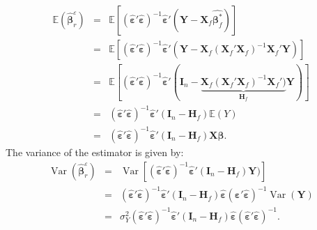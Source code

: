 \documentclass[12pt,a4paper]{report}
\begin{document}
\begin{eqnarray}
	\mathbb{E}(\hat{\boldsymbol{\beta}}_r^{\varepsilon})&=&\mathbb{E}[(\hat{\boldsymbol{\varepsilon}}'\hat{\boldsymbol{\varepsilon}})^{-1}\hat{\boldsymbol{\varepsilon}}'(\boldsymbol{Y}- \boldsymbol{X}_f\hat{\boldsymbol{\beta}^*_f})] \nonumber \\
	&=&\mathbb{E}[(\hat{\boldsymbol{\varepsilon}}'\hat{\boldsymbol{\varepsilon}})^{-1}\hat{\boldsymbol{\varepsilon}}'(\boldsymbol{Y}- \boldsymbol{X}_f(\boldsymbol{X}_f'\boldsymbol{X}_f)^{-1}\boldsymbol{X}_f'\boldsymbol{Y})]  \nonumber \\
	&=&\mathbb{E}[(\hat{\boldsymbol{\varepsilon}}'\hat{\boldsymbol{\varepsilon}})^{-1}\hat{\boldsymbol{\varepsilon}}'(\boldsymbol{I}_n- \underbrace{\boldsymbol{X}_f(\boldsymbol{X}_f'\boldsymbol{X}_f)^{-1}\boldsymbol{X}_f')}_{\boldsymbol{H}_f}\boldsymbol{Y})] \nonumber  \\
	&=&(\hat{\boldsymbol{\varepsilon}}'\hat{\boldsymbol{\varepsilon}})^{-1}\hat{\boldsymbol{\varepsilon}}'(\boldsymbol{I}_n- \boldsymbol{H}_f) \mathbb{E} (Y)\nonumber \\
	&=&(\hat{\boldsymbol{\varepsilon}}'\hat{\boldsymbol{\varepsilon}})^{-1}\hat{\boldsymbol{\varepsilon}}'(\boldsymbol{I}_n- \boldsymbol{H}_f) \boldsymbol{X}\boldsymbol{\beta}.\nonumber
\end{eqnarray}
The variance of the estimator is given by:
\begin{eqnarray}
	\operatorname{Var}(\hat{\boldsymbol{\beta}}_r^{\varepsilon})&=& \operatorname{Var}[(\hat{\boldsymbol{\varepsilon}}'\hat{\boldsymbol{\varepsilon}})^{-1}\hat{\boldsymbol{\varepsilon}}'(\boldsymbol{I}_n- \boldsymbol{H}_f)\boldsymbol{Y})] \nonumber  \\
	&=&(\hat{\boldsymbol{\varepsilon}}'\hat{\boldsymbol{\varepsilon}})^{-1}\hat{\boldsymbol{\varepsilon}}'(\boldsymbol{I}_n-\boldsymbol{H}_f)\hat{\boldsymbol{\varepsilon}}(\hat{\boldsymbol{\varepsilon}}'\hat{\boldsymbol{\varepsilon}})^{-1}\operatorname{Var}(\boldsymbol{Y}) \nonumber\\
	&=&\sigma^2_Y(\hat{\boldsymbol{\varepsilon}}'\hat{\boldsymbol{\varepsilon}})^{-1}\hat{\boldsymbol{\varepsilon}}'(\boldsymbol{I}_n-\boldsymbol{H}_f)\hat{\boldsymbol{\varepsilon}}(\hat{\boldsymbol{\varepsilon}}'\hat{\boldsymbol{\varepsilon}})^{-1}  . \label{varpluginr}
\end{eqnarray}
\end{document}
